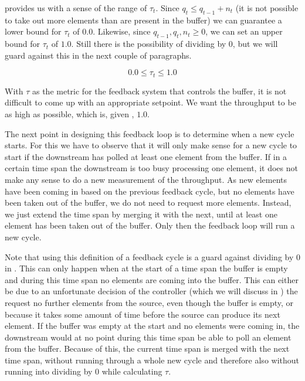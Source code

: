  provides us with a sense of the range of $\tau_t$. Since $q_t \leq q_{t-1} + n_t$ (it is not possible to take out more elements than are present in the buffer) we can guarantee a lower bound for $\tau_t$ of $0.0$. Likewise, since $q_{t-1}, q_t, n_t \geq 0$, we can set an upper bound for $\tau_t$ of $1.0$. Still there is the possibility of dividing by 0, but we will guard against this in the next couple of paragraphs.

\begin{equation}\label{eq:range-of-tau}
0.0 \leq \tau_t \leq 1.0
\end{equation}

With $\tau$ as the metric for the feedback system that controls the buffer, it is not difficult to come up with an appropriate setpoint. We want the throughput to be as high as possible, which is, given , $1.0$.

The next point in designing this feedback loop is to determine when a new cycle starts. For this we have to observe that it will only make sense for a new cycle to start if the downstream has polled at least one element from the buffer. If in a certain time span the downstream is too busy processing one element, it does not make any sense to do a new measurement of the throughput. As new elements have been coming in based on the previous feedback cycle, but no elements have been taken out of the buffer, we do not need to request more elements. Instead, we just extend the time span by merging it with the next, until at least one element has been taken out of the buffer. Only then the feedback loop will run a new cycle.

Note that using this definition of a feedback cycle is a guard against dividing by 0 in . This can only happen when at the start of a time span the buffer is empty and during this time span no elements are coming into the buffer. This can either be due to an unfortunate decision of the controller (which we will discuss in ) the request no further elements from the source, even though the buffer is empty, or because it takes some amount of time before the source can produce its next element. If the buffer was empty at the start and no elements were coming in, the downstream would at no point during this time span be able to poll an element from the buffer. Because of this, the current time span is merged with the next time span, without running through a whole new cycle and therefore also without running into dividing by 0 while calculating $\tau$.

